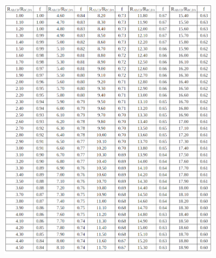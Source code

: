 \documentclass[
reprint,
amsmath,amssymb,
aps,
tikz,
border=5pt
]{revtex4-1}
\begin{document}
  \clearpage
\onecolumngrid
\begin{figure}
  \includegraphics{figures/funcTable.png}
\end{figure}
\end{document}

